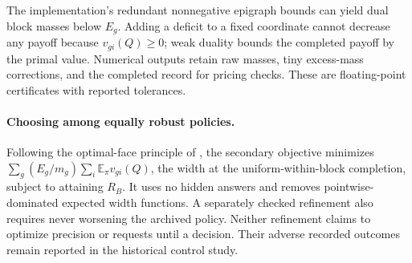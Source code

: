 The implementation's redundant nonnegative epigraph bounds can yield dual
block masses below $E_g$. Adding a deficit to a fixed coordinate cannot
decrease any payoff because $v_{gi}(Q)\geq0$; weak duality bounds the
completed payoff by the primal value. Numerical outputs retain raw masses,
tiny excess-mass corrections, and the completed record for pricing checks.
These are floating-point certificates with reported tolerances.

\paragraph{Choosing among equally robust policies.}\label{sec:tie-selection}
Following the optimal-face principle of \citet{iancu2014}, the secondary
objective minimizes $\sum_g(E_g/m_g)\sum_i\mathbb E_\pi v_{gi}(Q)$,
the width at the uniform-within-block completion, subject to attaining
$R_B$. It uses no hidden answers and removes pointwise-dominated expected
width functions. A separately checked refinement also requires never
worsening the archived policy. Neither refinement claims to optimize
precision or requests until a decision. Their adverse recorded outcomes
remain reported in the historical control study.

